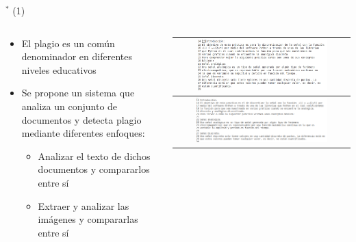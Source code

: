 
\begin{frame}{$^*$  (1)}
\begin{columns}
\begin{column}{0.6\textwidth}
	\begin{itemize}
		\item El plagio es un común denominador en diferentes niveles educativos
        \item Se propone un sistema que analiza un conjunto de documentos y detecta plagio mediante diferentes enfoques:
		\begin{itemize}
		\item Analizar el texto de dichos documentos y compararlos entre sí
		\item Extraer y analizar las imágenes y compararlas entre sí
		\end{itemize}
	\end{itemize}
\end{column}
\begin{column}{0.4\textwidth}  
\begin{center}
     \begin{tabular}{c}
\includegraphics[width=0.78\textwidth]{2022_Plagio/figs/P1}\\ \hline
\includegraphics[width=0.78\textwidth]{2022_Plagio/figs/P2}\\         
      \end{tabular}
\end{center}
\end{column} 
\end{columns} 
\end{frame}


